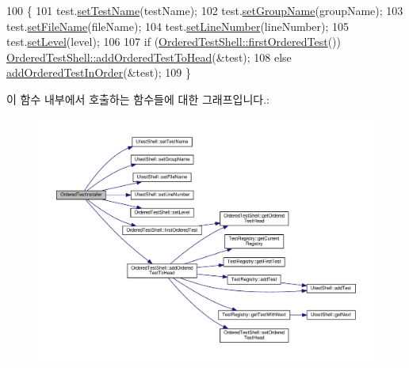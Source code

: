 \begin{DoxyCode}
100 \{
101     test.\hyperlink{class_utest_shell_adcba7e1f936ea12d57c7ef2949c9fd08}{setTestName}(testName);
102     test.\hyperlink{class_utest_shell_a1bd15ccf10b94d820271b74ff6e9c534}{setGroupName}(groupName);
103     test.\hyperlink{class_utest_shell_a276904542d6a7885b80ea9e494e8bc20}{setFileName}(fileName);
104     test.\hyperlink{class_utest_shell_ab16999ec38298569f6eb6933ca0416b3}{setLineNumber}(lineNumber);
105     test.\hyperlink{class_ordered_test_shell_a4c47f9adbca525f247fe53e4bc945a6d}{setLevel}(level);
106 
107     \textcolor{keywordflow}{if} (\hyperlink{class_ordered_test_shell_a509234169bb1cb6c2cd7e3acc0798f99}{OrderedTestShell::firstOrderedTest}()) 
      \hyperlink{class_ordered_test_shell_a9159769f3660da7bb89a8c4f4085499f}{OrderedTestShell::addOrderedTestToHead}(&test);
108     \textcolor{keywordflow}{else} \hyperlink{class_ordered_test_installer_a540a39671d7fc6c51fb463c2695dad15}{addOrderedTestInOrder}(&test);
109 \}
\end{DoxyCode}


이 함수 내부에서 호출하는 함수들에 대한 그래프입니다.\+:
\nopagebreak
\begin{figure}[H]
\begin{center}
\leavevmode
\includegraphics[width=350pt]{class_ordered_test_installer_a810d542952569b67e0b3956c361aee58_cgraph}
\end{center}
\end{figure}


